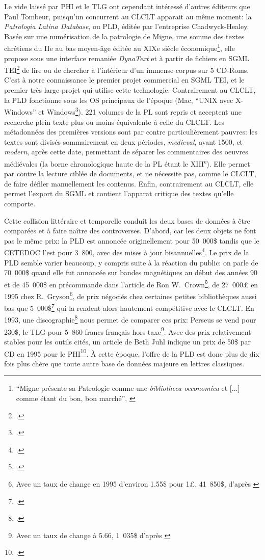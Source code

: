 Le vide laissé par PHI et le TLG ont cependant intéressé d'autres éditeurs que Paul Tombeur, puisqu'un concurrent au CLCLT apparait au même moment: la \textit{Patrologia Latina Database}, ou PLD, éditée par l'entreprise Chadwyck-Healey. Basée sur une numérisation de la patrologie de Migne, une somme des textes chrétiens du IIe au bas moyen-âge éditée au XIXe siècle économique\footnote{\enquote{Migne présente sa Patrologie comme une \textit{bibliotheca oeconomica} et {[...]} comme étant du bon, bon marché}, \cite[p. 228]{tombeur_pld_1993}}, elle propose sous une interface remaniée \textit{DynaText} et à partir de fichiers en SGML TEI\footcite{smith_dynatext_1993} de lire ou de chercher à l'intérieur d'un immense corpus sur 5 CD-Roms. C'est à notre connaissance le premier projet commercial en SGML TEI, et le premier très large projet qui utilise cette technologie. Contrairement au CLCLT, la PLD fonctionne sous les OS principaux de l'époque (Mac, \enquote{UNIX avec X-Windows} et Windows\footcite{smith_dynatext_1993}). 221 volumes de la PL sont repris et acceptent une recherche plein texte plus ou moins équivalente à celle du CLCLT. Les métadonnées des premières versions sont par contre particulièrement pauvres: les textes sont divisés sommairement en deux périodes, \textit{medieval}, avant 1500, et \textit{modern}, après cette date, permettant de séparer les commentaires des oeuvres médiévales (la borne chronologique haute de la PL étant le XIII\textsuperscript{e}). Elle permet par contre la lecture ciblée de documents, et ne nécessite pas, comme le CLCLT, de faire défiler manuellement les contenus. Enfin, contrairement au CLCLT, elle permet l'export du SGML et contient l'apparat critique des textes qu'elle comporte.

Cette collision littéraire et temporelle conduit les deux bases de données à être comparées et à faire naître des controverses. D'abord, car les deux objets ne font pas le même prix: la PLD est annoncée originellement pour 50~000\$ tandis que le CETEDOC l'est pour 3~800, avec des mises à jour bisannuelles\footcite{bucknall_review_1994}. Le prix de la PLD semble varier beaucoup, y compris suite à la réaction du public: on parle de 70~000\$ quand elle fut annoncée sur bandes magnétiques au début des années 90 et de 45~000\$ en précommande dans l'article de Ron W.~Crown\footcite{crown_comparing_2000}, de 27~000£ en 1995 chez R.~Gryson\footnote{Avec un taux de change en 1995 d'environ 1.55\$ pour 1£, 41~850\$, d'après \cite{noauthor_british_2021}}, de prix négociés chez certaines petites bibliothèques aussi bas que 5~000\$\footcite[Note 10, p.~108]{crown_comparing_2000} qui la rendent alors hautement compétitive avec le CLCLT. En 1993, une discographie\footcite{pellen_les_1993} nous permet de comparer ces prix: Perseus se vend pour 230\$, le TLG pour 5~860 francs français hors taxe\footnote{Avec un taux de change à 5.66, 1~035\$ d'après \cite{noauthor_france_nodate}}. Avec des prix relativement stables pour les outils cités, un article de Beth Juhl indique un prix de 50\$ par CD en 1995 pour le PHI\footcite{juhl_ex_1995}. À cette époque, l'offre de la PLD est donc plus de dix fois plus chère que toute autre base de données majeure en lettres classiques.

